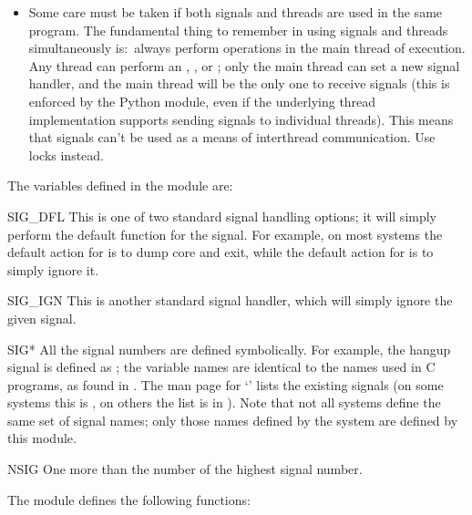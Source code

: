 \begin{itemize}
\item
Some care must be taken if both signals and threads are used in the
same program.  The fundamental thing to remember in using signals and
threads simultaneously is:\ always perform  operations
in the main thread of execution.  Any thread can perform an
, , or ;
only the main thread can set a new signal handler, and the main thread
will be the only one to receive signals (this is enforced by the
Python  module, even if the underlying thread
implementation supports sending signals to individual threads).  This
means that signals can't be used as a means of interthread
communication.  Use locks instead.

\end{itemize}

The variables defined in the  module are:

\begin{datadesc}{SIG_DFL}
  This is one of two standard signal handling options; it will simply
  perform the default function for the signal.  For example, on most
  systems the default action for  is to dump core
  and exit, while the default action for  is to
  simply ignore it.
\end{datadesc}

\begin{datadesc}{SIG_IGN}
  This is another standard signal handler, which will simply ignore
  the given signal.
\end{datadesc}

\begin{datadesc}{SIG*}
  All the signal numbers are defined symbolically.  For example, the
  hangup signal is defined as ; the variable names
  are identical to the names used in C programs, as found in
  .
  The \UNIX{} man page for `' lists the existing
  signals (on some systems this is , on others the
  list is in ).
  Note that not all systems define the same set of signal names; only
  those names defined by the system are defined by this module.
\end{datadesc}

\begin{datadesc}{NSIG}
  One more than the number of the highest signal number.
\end{datadesc}

The  module defines the following functions:

